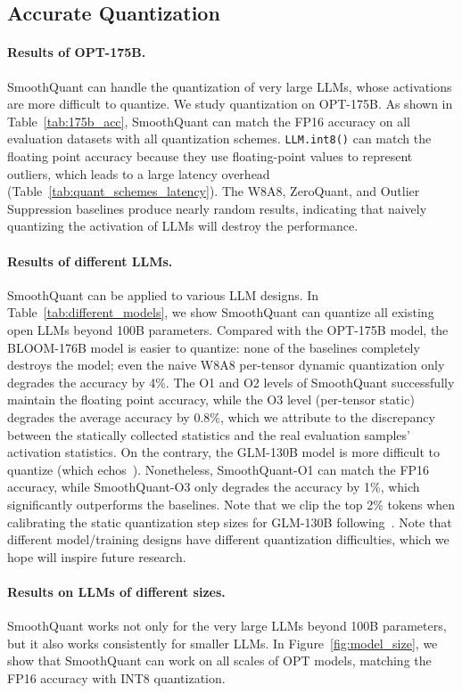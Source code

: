 \subsection{Accurate Quantization}
\label{sec:accurate-quantization}
\paragraph{Results of OPT-175B.} SmoothQuant can handle the quantization of very large LLMs, whose activations are more difficult to quantize. We study quantization on OPT-175B. As shown in Table~\ref{tab:175b_acc}, SmoothQuant can match the FP16 accuracy on all evaluation datasets with all quantization schemes. \texttt{LLM.int8()} can match the floating point accuracy because they use floating-point values to represent outliers, which leads to a large latency overhead (Table~\ref{tab:quant_schemes_latency}). The W8A8, ZeroQuant, and Outlier Suppression baselines produce nearly random results, indicating that naively quantizing the activation of LLMs will destroy the performance.
\paragraph{Results of different LLMs.} SmoothQuant can be applied to various LLM designs. In Table~\ref{tab:different_models}, we show SmoothQuant can quantize all existing open LLMs beyond 100B parameters. Compared with the OPT-175B model, the BLOOM-176B model is easier to quantize: none of the baselines completely destroys the model; even the naive W8A8 per-tensor dynamic quantization only degrades the accuracy by 4\%. The O1 and O2 levels of SmoothQuant successfully maintain the floating point accuracy, while the O3 level (per-tensor static) degrades the average accuracy by 0.8\%, which we attribute to the discrepancy between the statically collected statistics and the real evaluation samples' activation statistics. On the contrary, the GLM-130B model is more difficult to quantize (which echos~\citeauthor{zeng2022glm}). Nonetheless, SmoothQuant-O1 can match the FP16 accuracy, while SmoothQuant-O3 only degrades the accuracy by 1\%, which significantly outperforms the baselines. Note that we clip the top 2\% tokens when calibrating the static quantization step sizes for GLM-130B following~\citet{outlier_suppression}.
Note that different model/training designs have different quantization difficulties, which we hope will inspire future research.

\paragraph{Results on LLMs of different sizes.} SmoothQuant works not only for the very large LLMs beyond 100B parameters, but it also works consistently for smaller LLMs. In Figure~\ref{fig:model_size}, we show that SmoothQuant can work on all scales of OPT models, matching the FP16 accuracy with INT8 quantization.

